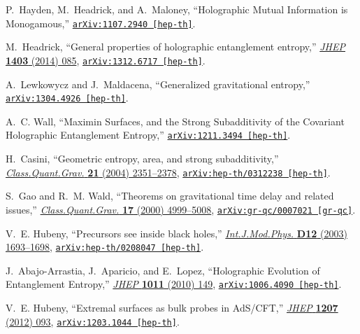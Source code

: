 \documentclass[12pt]{article}
\begin{document}
\begin{thebibliography}{10}
P.~Hayden, M.~Headrick, and A.~Maloney, ``{Holographic Mutual Information is
  Monogamous},''
\href{http://arxiv.org/abs/1107.2940}{{\tt arXiv:1107.2940 [hep-th]}}.

M.~Headrick, ``{General properties of holographic entanglement entropy},''
  \href{http://dx.doi.org/10.1007/JHEP03(2014)085}{{\em JHEP} {\bf 1403} (2014)
   085},
\href{http://arxiv.org/abs/1312.6717}{{\tt arXiv:1312.6717 [hep-th]}}.

A.~Lewkowycz and J.~Maldacena, ``{Generalized gravitational entropy},''
\href{http://arxiv.org/abs/1304.4926}{{\tt arXiv:1304.4926 [hep-th]}}.

A.~C. Wall, ``{Maximin Surfaces, and the Strong Subadditivity of the Covariant
  Holographic Entanglement Entropy},''
\href{http://arxiv.org/abs/1211.3494}{{\tt arXiv:1211.3494 [hep-th]}}.

H.~Casini, ``{Geometric entropy, area, and strong subadditivity},''
  \href{http://dx.doi.org/10.1088/0264-9381/21/9/011}{{\em Class.Quant.Grav.}
  {\bf 21} (2004)  2351--2378},
\href{http://arxiv.org/abs/hep-th/0312238}{{\tt arXiv:hep-th/0312238
  [hep-th]}}.

S.~Gao and R.~M. Wald, ``{Theorems on gravitational time delay and related
  issues},'' \href{http://dx.doi.org/10.1088/0264-9381/17/24/305}{{\em
  Class.Quant.Grav.} {\bf 17} (2000)  4999--5008},
\href{http://arxiv.org/abs/gr-qc/0007021}{{\tt arXiv:gr-qc/0007021 [gr-qc]}}.

V.~E. Hubeny, ``{Precursors see inside black holes},''
  \href{http://dx.doi.org/10.1142/S0218271803003992}{{\em Int.J.Mod.Phys.} {\bf
  D12} (2003)  1693--1698},
\href{http://arxiv.org/abs/hep-th/0208047}{{\tt arXiv:hep-th/0208047
  [hep-th]}}.

J.~Abajo-Arrastia, J.~Aparicio, and E.~Lopez, ``{Holographic Evolution of
  Entanglement Entropy},''
  \href{http://dx.doi.org/10.1007/JHEP11(2010)149}{{\em JHEP} {\bf 1011} (2010)
   149},
\href{http://arxiv.org/abs/1006.4090}{{\tt arXiv:1006.4090 [hep-th]}}.

V.~E. Hubeny, ``{Extremal surfaces as bulk probes in AdS/CFT},''
  \href{http://dx.doi.org/10.1007/JHEP07(2012)093}{{\em JHEP} {\bf 1207} (2012)
   093},
\href{http://arxiv.org/abs/1203.1044}{{\tt arXiv:1203.1044 [hep-th]}}.


\end{thebibliography}
\end{document}
